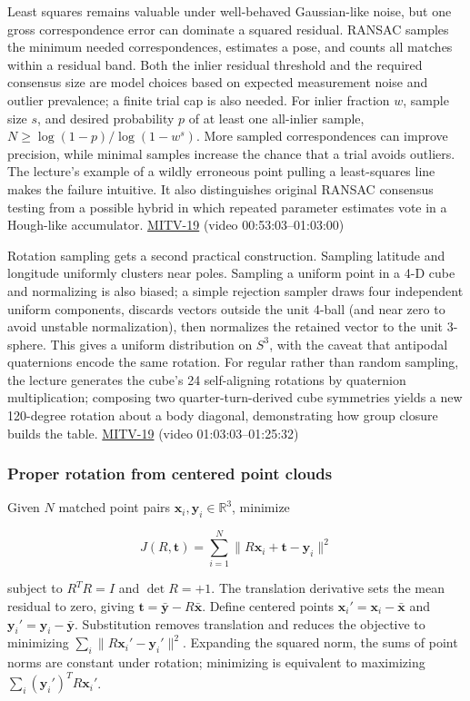 Least squares remains valuable under well-behaved Gaussian-like noise, but one gross correspondence error can dominate a squared residual. RANSAC samples the minimum needed correspondences, estimates a pose, and counts all matches within a residual band. Both the inlier residual threshold and the required consensus size are model choices based on expected measurement noise and outlier prevalence; a finite trial cap is also needed. For inlier fraction \(w\), sample size \(s\), and desired probability \(p\) of at least one all-inlier sample, \(N\ge\log(1-p)/\log(1-w^s)\). More sampled correspondences can improve precision, while minimal samples increase the chance that a trial avoids outliers. The lecture's example of a wildly erroneous point pulling a least-squares line makes the failure intuitive. It also distinguishes original RANSAC consensus testing from a possible hybrid in which repeated parameter estimates vote in a Hough-like accumulator. \hyperref[04-visual-computing-ii-ch036]{MITV-19} (video 00:53:03--01:03:00)

Rotation sampling gets a second practical construction. Sampling latitude and longitude uniformly clusters near poles. Sampling a uniform point in a 4-D cube and normalizing is also biased; a simple rejection sampler draws four independent uniform components, discards vectors outside the unit 4-ball (and near zero to avoid unstable normalization), then normalizes the retained vector to the unit 3-sphere. This gives a uniform distribution on \(S^3\), with the caveat that antipodal quaternions encode the same rotation. For regular rather than random sampling, the lecture generates the cube's 24 self-aligning rotations by quaternion multiplication; composing two quarter-turn-derived cube symmetries yields a new 120-degree rotation about a body diagonal, demonstrating how group closure builds the table. \hyperref[04-visual-computing-ii-ch036]{MITV-19} (video 01:03:03--01:25:32)

\subsubsection{Proper rotation from centered point clouds}\label{proper-rotation-from-centered-point-clouds}

Given \(N\) matched point pairs \(\mathbf x_i,\mathbf y_i\in\mathbb R^3\), minimize

\[
J(R,\mathbf t)=\sum_{i=1}^N\|R\mathbf x_i+\mathbf t-\mathbf y_i\|^2
\]

subject to \(R^TR=I\) and \(\det R=+1\). The translation derivative sets the mean residual to zero, giving \(\mathbf t=\bar{\mathbf y}-R\bar{\mathbf x}\). Define centered points \(\mathbf x_i'=\mathbf x_i-\bar{\mathbf x}\) and \(\mathbf y_i'=\mathbf y_i-\bar{\mathbf y}\). Substitution removes translation and reduces the objective to minimizing \(\sum_i\|R\mathbf x_i'-\mathbf y_i'\|^2\). Expanding the squared norm, the sums of point norms are constant under rotation; minimizing is equivalent to maximizing \(\sum_i(\mathbf y_i')^TR\mathbf x_i'\).

